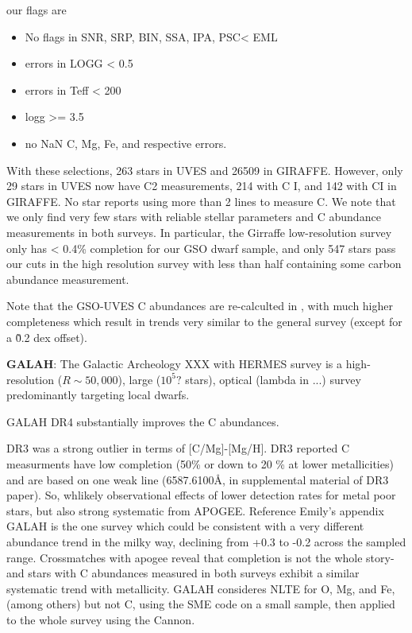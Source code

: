\documentclass[11pt]{article}
\newcommand{\caah}{[C/Mg]-[Mg/H]}
\begin{document}
our flags are
\begin{itemize}
    \item No flags in SNR, SRP, BIN, SSA, IPA, PSC< EML
    \item errors in LOGG < 0.5
    \item errors in Teff < 200
    \item logg >= 3.5
    \item no NaN C, Mg, Fe, and respective errors.
\end{itemize}

With these selections, 263 stars in UVES and 26509 in GIRAFFE. However, only 29 stars in UVES now have C2 measurements, 214 with C I, and 142 with CI in GIRAFFE. No star reports using more than 2 lines to measure C.
We note that we only find very few stars with reliable stellar parameters and C abundance measurements in both surveys. In particular, the Girraffe low-resolution survey only has < 0.4\% completion for our GSO dwarf sample, and only 547 stars pass our cuts in the high resolution survey with less than half containing some carbon abundance measurement.

Note that the GSO-UVES C abundances are re-calculted in \citet{franchini+20}, with much higher completeness
which result in trends very similar to the general survey (except for a \~ 0.2 dex offset).


\textbf{GALAH}: 
The Galactic Archeology XXX with HERMES survey \citep{DeSilva2015, Martell2017}
is a high-resolution ($R\sim 50,000$), large ($10^5?$ stars), optical (lambda in ...) survey predominantly targeting local dwarfs.

GALAH DR4 substantially improves the C abundances. 

DR3 was a strong outlier in terms of \caah. DR3 reported C measurments have low completion (50\% or down to 20 \% at lower metallicities) and are based on one weak line (6587.6100Å, in supplemental material of DR3 paper).
So, whlikely observational effects of lower detection rates for metal poor stars, but also strong systematic from APOGEE. Reference Emily's appendix
GALAH is the one survey which could be consistent with a very different abundance trend in the milky way, declining from +0.3 to -0.2 across the sampled range. 
Crossmatches with apogee reveal that completion is not the whole story-and stars with C abundances measured in both surveys exhibit a similar systematic trend with metallicity. 
GALAH consideres NLTE for O, Mg, and Fe, (among others) but not C, using the SME code on a small sample, then applied to the whole survey using the Cannon.
\end{document}
